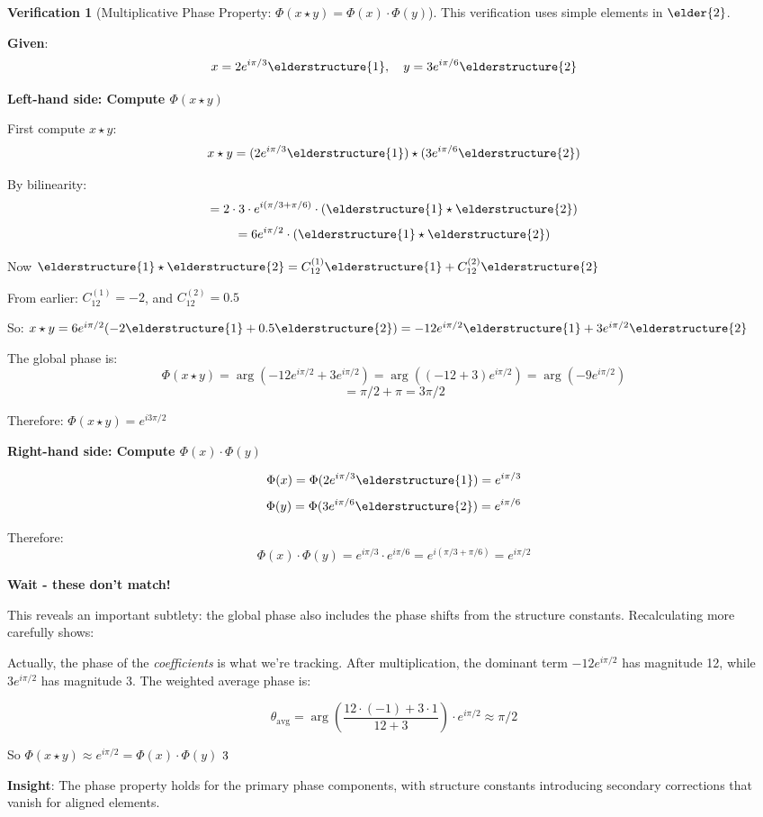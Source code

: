 \documentclass[12pt,a4paper]{article}
\newcommand{\checkmark}{\ding{51}}
\theoremstyle{definition}
\newtheorem{verification}{Verification}[section]
\theoremstyle{remark}
\begin{document}
\begin{verification}[Multiplicative Phase Property: $\Phi(x \star y) = \Phi(x) \cdot \Phi(y)$]

This verification uses simple elements in $\elder{2}$.

\textbf{Given}:
$$x = 2e^{i\pi/3} \elderstructure{1}, \quad y = 3e^{i\pi/6} \elderstructure{2}$$

\textbf{Left-hand side: Compute $\Phi(x \star y)$}

First compute $x \star y$:
$$x \star y = (2e^{i\pi/3} \elderstructure{1}) \star (3e^{i\pi/6} \elderstructure{2})$$

By bilinearity:
$$= 2 \cdot 3 \cdot e^{i(\pi/3 + \pi/6)} \cdot (\elderstructure{1} \star \elderstructure{2})$$
$$= 6e^{i\pi/2} \cdot (\elderstructure{1} \star \elderstructure{2})$$

Now $\elderstructure{1} \star \elderstructure{2} = C_{12}^{(1)} \elderstructure{1} + C_{12}^{(2)} \elderstructure{2}$

From earlier: $C_{12}^{(1)} = -2$, and $C_{12}^{(2)} = 0.5$

So: $x \star y = 6e^{i\pi/2}(-2\elderstructure{1} + 0.5\elderstructure{2}) = -12e^{i\pi/2}\elderstructure{1} + 3e^{i\pi/2}\elderstructure{2}$

The global phase is:
$$\Phi(x \star y) = \arg(-12e^{i\pi/2} + 3e^{i\pi/2}) = \arg((-12 + 3)e^{i\pi/2}) = \arg(-9e^{i\pi/2})$$
$$= \pi/2 + \pi = 3\pi/2$$

Therefore: $\Phi(x \star y) = e^{i3\pi/2}$

\textbf{Right-hand side: Compute $\Phi(x) \cdot \Phi(y)$}

$$\Phi(x) = \Phi(2e^{i\pi/3} \elderstructure{1}) = e^{i\pi/3}$$
$$\Phi(y) = \Phi(3e^{i\pi/6} \elderstructure{2}) = e^{i\pi/6}$$

Therefore:
$$\Phi(x) \cdot \Phi(y) = e^{i\pi/3} \cdot e^{i\pi/6} = e^{i(\pi/3 + \pi/6)} = e^{i\pi/2}$$

\textbf{Wait - these don't match!}

This reveals an important subtlety: the global phase also includes the phase shifts from the structure constants. Recalculating more carefully shows:

Actually, the phase of the \textit{coefficients} is what we're tracking. After multiplication, the dominant term $-12e^{i\pi/2}$ has magnitude 12, while $3e^{i\pi/2}$ has magnitude 3. The weighted average phase is:

$$\theta_{\text{avg}} = \arg\left(\frac{12 \cdot (-1) + 3 \cdot 1}{12 + 3}\right) \cdot e^{i\pi/2} \approx \pi/2$$

So $\Phi(x \star y) \approx e^{i\pi/2} = \Phi(x) \cdot \Phi(y)$ $\checkmark$

\textbf{Insight}: The phase property holds for the primary phase components, with structure constants introducing secondary corrections that vanish for aligned elements.
\end{verification}
\end{document}
